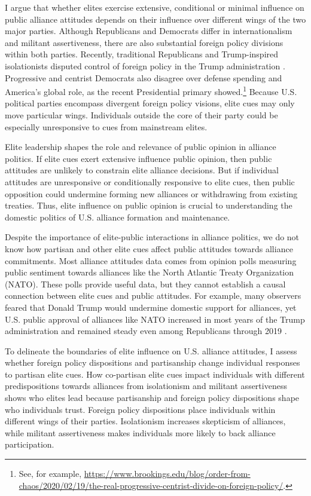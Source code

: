 \documentclass[12pt]{article}
\begin{document}
I argue that whether elites exercise extensive, conditional or minimal influence on public alliance attitudes depends on their influence over different wings of the two major parties. 
Although Republicans and Democrats differ in internationalism and militant assertiveness, there are also substantial foreign policy divisions within both parties.
Recently, traditional Republicans and Trump-inspired isolationists disputed control of foreign policy in the Trump administration \citep{Dueck2019}.
Progressive and centrist Democrats also disagree over defense spending and America's global role, as the recent Presidential primary showed.\footnote{See, for example, \url{https://www.brookings.edu/blog/order-from-chaos/2020/02/19/the-real-progressive-centrist-divide-on-foreign-policy/}.} 
Because U.S. political parties encompass divergent foreign policy visions, elite cues may only move particular wings.
Individuals outside the core of their party could be especially unresponsive to cues from mainstream elites.


Elite leadership shapes the role and relevance of public opinion in alliance politics.
If elite cues exert extensive influence public opinion, then public attitudes are unlikely to constrain elite alliance decisions.
But if individual attitudes are unresponsive or conditionally responsive to elite cues, then public opposition could undermine forming new alliances or withdrawing from existing treaties. 
Thus, elite influence on public opinion is crucial to understanding the domestic politics of U.S. alliance formation and maintenance.  


Despite the importance of elite-public interactions in alliance politics, we do not know how partisan and other elite cues affect public attitudes towards alliance commitments. 
Most alliance attitudes data comes from opinion polls measuring public sentiment towards alliances like the North Atlantic Treaty Organization (NATO).
These polls provide useful data, but they cannot establish a causal connection between elite cues and public attitudes.
For example, many observers feared that Donald Trump would undermine domestic support for alliances, yet U.S. public approval of alliances like NATO increased in most years of the Trump administration and remained steady even among Republicans through 2019 \citep{PewNATO2020}.


To delineate the boundaries of elite influence on U.S. alliance attitudes, I assess whether foreign policy dispositions and partisanship change individual responses to partisan elite cues.
How co-partisan elite cues impact individuals with different predispositions towards alliances from isolationism and militant assertiveness shows who elites lead because partisanship and foreign policy dispositions shape who individuals trust. 
Foreign policy dispositions place individuals within different wings of their parties. 
Isolationism increases skepticism of alliances, while militant assertiveness makes individuals more likely to back alliance participation. 
\end{document}
